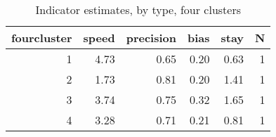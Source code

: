 \begin{table}

\caption{\label{tab:}Indicator estimates, by type, four clusters}
\centering
\begin{tabular}[t]{rrrrrr}
\toprule
fourcluster & speed & precision & bias & stay & N\\
\midrule
1 & 4.73 & 0.65 & 0.20 & 0.63 & 1\\
2 & 1.73 & 0.81 & 0.20 & 1.41 & 1\\
3 & 3.74 & 0.75 & 0.32 & 1.65 & 1\\
4 & 3.28 & 0.71 & 0.21 & 0.81 & 1\\
\bottomrule
\end{tabular}
\end{table}
